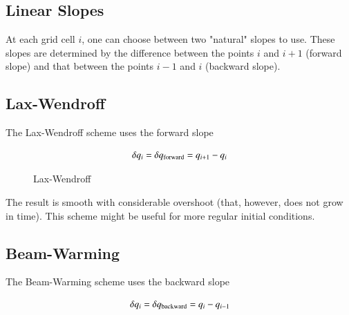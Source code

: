 \subsection{Linear Slopes}

At each grid cell $i$, one can choose between two "natural" slopes to use. These slopes are determined by the difference between the points $i$ and $i+1$ (forward slope) and that between the points $i-1$ and $i$ (backward slope).  


\subsection{Lax-Wendroff}

The Lax-Wendroff scheme uses the forward slope

\begin{equation}
\delta q_i = \delta q_{\rm forward} = q_{i+1} - q_i
\end{equation}


\begin{figure}
  \begin{center}
  \end{center}
  \caption[]{Lax-Wendroff}
  \label{fig:lax-wendroff}
\end{figure}

The result is smooth  with considerable overshoot (that, however, does not grow in time). This scheme might be useful for more regular initial conditions.

\subsection{Beam-Warming}

The Beam-Warming scheme  uses the backward slope

\begin{equation}
\delta q_i = \delta q_{\rm backward} = q_{i} - q_{i-1}
\end{equation}

